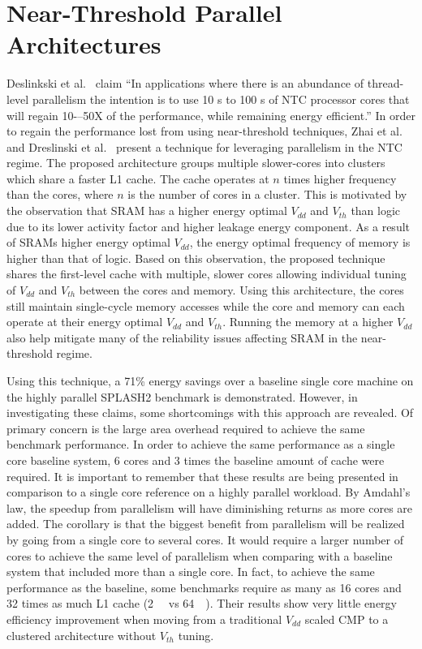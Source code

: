 \section{Near-Threshold Parallel Architectures} \label{sec:clustering}

Deslinkski et al.~\cite{dreslinski2010near} claim ``In applications where there
is an abundance of thread-level parallelism the intention is to use 10 s to 100
s of NTC processor cores that will regain 10-–50X of the performance, while
remaining energy efficient.'' In order to regain the performance lost from using
near-threshold techniques, Zhai et al.~\cite{Zhai:2007kn} and Dreslinski et
al.~\cite{Dreslinski:2007id} present a technique for leveraging parallelism in
the NTC regime. The proposed architecture groups multiple slower-cores into
clusters which share a faster L1 cache. The cache operates at $n$ times higher
frequency than the cores, where $n$ is the number of cores in a cluster. This is
motivated by the observation that SRAM has a higher energy optimal $V_{dd}$ and
$V_{th}$ than logic due to its lower activity factor and higher leakage energy
component. As a result of SRAMs higher energy optimal $V_{dd}$, the energy
optimal frequency of memory is higher than that of logic.  Based on this
observation, the proposed technique shares the first-level cache with multiple,
slower cores allowing individual tuning of $V_{dd}$ and $V_{th}$ between the
cores and memory. Using this architecture, the cores still maintain single-cycle
memory accesses while the core and memory can each operate at their energy
optimal $V_{dd}$ and $V_{th}$. Running the memory at a higher $V_{dd}$ also help
mitigate many of the reliability issues affecting SRAM in the near-threshold
regime.

Using this technique, a 71\% energy savings over a baseline single core machine
on the highly parallel SPLASH2 benchmark is demonstrated. However, in
investigating these claims, some shortcomings with this approach are revealed.
Of primary concern is the large area overhead required to achieve the same
benchmark performance. In order to achieve the same performance as a single core
baseline system, 6 cores and 3 times the baseline amount of cache were required.
It is important to remember that these results are being presented in comparison
to a single core reference on a highly parallel workload. By Amdahl's law, the
speedup from parallelism will have diminishing returns as more cores are added.
The corollary is that the biggest benefit from parallelism will be realized by
going from a single core to several cores.  It would require a larger number of
cores to achieve the same level of parallelism when comparing with a baseline
system that included more than a single core. In fact, to achieve the same
performance as the baseline, some benchmarks require as many as 16 cores and 32
times as much L1 cache (\SI{2}{\mega\byte} vs \SI{64}{\kilo\byte}). Their
results show very little energy efficiency improvement when moving from a
traditional $V_{dd}$ scaled CMP to a clustered architecture without $V_{th}$
tuning.

